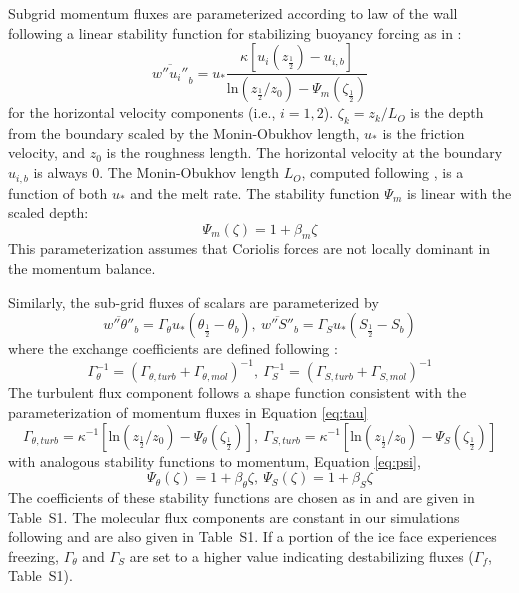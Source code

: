 \documentclass[tc, manuscript]{copernicus}
\begin{document}
Subgrid momentum fluxes are parameterized according to law of the wall following a linear stability function for stabilizing buoyancy forcing as in \citet{vreugdenhil_stratification_2019}:
%
\begin{equation} \label{eq:tau}
    \overline{w''u_i''}_b = u_* \frac{ \kappa \left[u_i\left(z_{\frac{1}{2}}\right) - u_{i,b} \right]}{\textrm{ln}\left(z_{\frac{1}{2}}/z_0\right)-\Psi_m\left(\zeta_{\frac{1}{2}}\right)}
\end{equation}
%
for the horizontal velocity components (i.e., $i=1,2$). $\zeta_k = z_k/L_O$ is the depth from the boundary scaled by the Monin-Obukhov length, $u_*$ is the friction velocity, and $z_0$ is the roughness length. The horizontal velocity at the boundary $u_{i,b}$ is always 0. The Monin-Obukhov length $L_O$, computed following \citet{mcphee_dynamics_1987}, is a function of both $u_*$ and the melt rate. The stability function $\Psi_m$ is linear with the scaled depth:
\begin{equation}\label{eq:psi}
    \Psi_m(\zeta) = 1 + \beta_m \zeta
\end{equation}
This parameterization assumes that Coriolis forces are not locally dominant in the momentum balance.

Similarly, the sub-grid fluxes of scalars are parameterized by
\begin{equation} \label{eq:melt_flux}
    \overline{w''\theta''}_b = \Gamma_{\theta} u_* \left(\theta_{\frac{1}{2}} - \theta_b\right),\: 
    \overline{w''S''}_b = \Gamma_S u_* \left(S_{\frac{1}{2}} - S_b\right)
\end{equation}
%
where the exchange coefficients are defined following \citet{mcphee_dynamics_1987}:
\begin{equation} \label{eq:gamma}
    \Gamma_{\theta}^{-1} = \left(\Gamma_{\theta,turb} + \Gamma_{\theta,mol}\right)^{-1},\:
    \Gamma_S^{-1} = \left(\Gamma_{S,turb} + \Gamma_{S,mol}\right)^{-1}
\end{equation}
%
The turbulent flux component follows a shape function consistent with the parameterization of momentum fluxes in Equation \ref{eq:tau}
\begin{equation} \label{eq:gamma_turb}
    \Gamma_{\theta,turb} = \kappa^{-1} \left[\textrm{ln}\left(z_{\frac{1}{2}}/z_0\right) - \Psi_{\theta}\left(\zeta_{\frac{1}{2}}\right)\right], \:
    \Gamma_{S,turb} = \kappa^{-1} \left[\textrm{ln}\left(z_{\frac{1}{2}}/z_0\right) - \Psi_S\left(\zeta_{\frac{1}{2}}\right)\right]
\end{equation}
with analogous stability functions to momentum, Equation \ref{eq:psi},
\begin{equation}
    \Psi_{\theta}(\zeta) = 1 + \beta_{\theta}\zeta, \:
    \Psi_{S}(\zeta) = 1 + \beta_{S}\zeta
\end{equation}
The coefficients of these stability functions are chosen as in \citet{zhou_self-similar_2017} and are given in Table~S1. The molecular flux components are constant in our simulations following \citet{mcphee_dynamics_1987} and are also given in Table~S1. If a portion of the ice face experiences freezing, $\Gamma_\theta$ and $\Gamma_S$ are set to a higher value indicating destabilizing fluxes ($\Gamma_{f}$, Table~S1).
\end{document}
